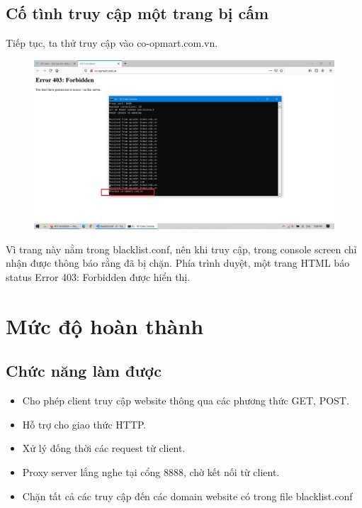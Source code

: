 \documentclass[12pt,a4paper]{article}
\begin{document}
		\subsection{Cố tình truy cập một trang bị cấm}
			Tiếp tục, ta thử truy cập vào co-opmart.com.vn.
			\begin{center}
				\begin{figure}[H]
					\begin{center}
						\includegraphics[scale=.335]{images/run_blocked}
					\end{center}
				\end{figure}
			\end{center}
			Vì trang này nằm trong blacklist.conf, nên khi truy cập, trong console screen chỉ nhận được thông báo rằng đã bị chặn. Phía trình duyệt, một trang HTML báo status Error 403: Forbidden được hiển thị.
	\section{Mức độ hoàn thành}
		\subsection{Chức năng làm được}
			\begin{itemize}
				\item Cho phép client truy cập website thông qua các phương thức GET, POST.
				\item Hỗ trợ cho giao thức HTTP.
				\item Xử lý đống thời các request từ client.
				\item Proxy server lắng nghe tại cổng 8888, chờ kết nối từ client.
				\item Chặn tất cả các truy cập đến các domain website có trong file blacklist.conf
			\end{itemize}
\end{document}
